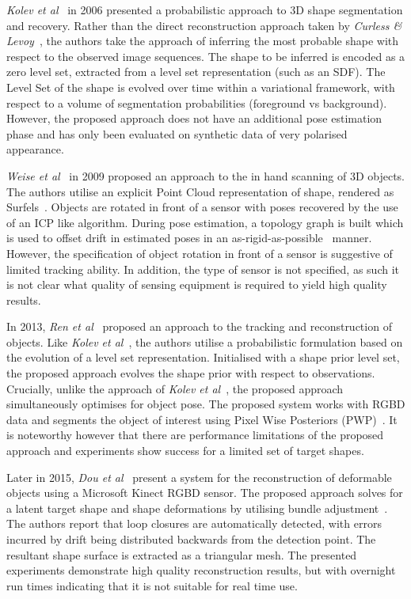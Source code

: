 \textit{Kolev et al}~\cite{Kolev2006} in 2006 presented a probabilistic approach to 3D shape 
segmentation and recovery. Rather than the direct reconstruction approach taken by 
\textit{Curless \& Levoy}~\cite{Curless1996}, the authors take the approach of inferring the most 
probable shape with respect to the observed image sequences. The shape to be inferred is encoded as a 
zero level set, extracted from a level set representation (such as an SDF). The Level Set of the shape is 
evolved over time within a variational framework, with respect to a volume of segmentation 
probabilities (foreground vs background). However, the proposed approach does not have an additional pose 
estimation phase and has only been evaluated on synthetic data of very polarised appearance.

\textit{Weise et al}~\cite{Weise2009} in 2009 proposed an approach to the in hand scanning of 3D objects. 
The authors utilise an explicit Point Cloud representation of shape, rendered as Surfels~\cite{Pfister2000}. 
Objects are rotated in front of a sensor with poses recovered by the use of an ICP like algorithm. During 
pose estimation, a topology graph is built which is used to offset drift in estimated poses in an 
as-rigid-as-possible~\cite{Igarashi2005} manner. However, the specification of object rotation in front of 
a sensor is suggestive of limited tracking ability. In addition, the type of sensor is not specified, 
as such it is not clear what quality of sensing equipment is required to yield high quality results.

In 2013, \textit{Ren et al}~\cite{Ren2013} proposed an approach to the tracking and reconstruction of 
objects. Like \textit{Kolev et al}~\cite{Kolev2006}, the authors utilise a probabilistic formulation 
based on the evolution of a level set representation. Initialised with a shape prior level set, the 
proposed approach evolves the shape prior with respect to observations. Crucially, unlike the approach of 
\textit{Kolev et al}~\cite{Kolev2006}, the proposed approach simultaneously optimises for object pose.
The proposed system works with RGBD data and segments the object of interest using Pixel Wise Posteriors 
(PWP)~\cite{Bibby2008}. It is noteworthy however that there are performance limitations of the proposed 
approach and experiments show success for a limited set of target shapes.

Later in 2015, \textit{Dou et al}~\cite{Dou2015} present a system for the reconstruction of deformable 
objects using a Microsoft Kinect RGBD sensor. The proposed approach solves for a latent target shape 
and shape deformations by utilising bundle adjustment~\cite{Triggs1999}. The authors report that loop 
closures are automatically detected, with errors incurred by drift being distributed backwards from the 
detection point. The resultant shape surface is extracted as a triangular mesh. The presented experiments 
demonstrate high quality reconstruction results, but with overnight run times indicating that it is not 
suitable for real time use.

